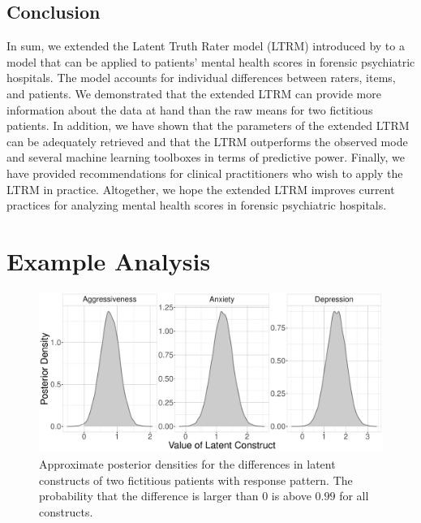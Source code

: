 \documentclass[a4paper,usenames,dvipsnames]{article}
\begin{document}
\subsection*{Conclusion}
In sum, we extended the Latent Truth Rater model (LTRM) introduced by  to a model that can be applied to patients' mental health scores in forensic psychiatric hospitals. The model accounts for individual differences between raters, items, and patients. We demonstrated that the extended LTRM can provide more information about the data at hand than the raw means for two fictitious patients. In addition, we have shown that the parameters of the extended LTRM can be adequately retrieved and that the LTRM outperforms the observed mode and several machine learning toolboxes in terms of predictive power. Finally, we have provided recommendations for clinical practitioners who wish to apply the LTRM in practice. Altogether, we hope the extended LTRM improves current practices for analyzing mental health scores in forensic psychiatric hospitals. 





\newpage
\appendix
{}

\section{Example Analysis}

\begin{figure}[!ht]
	\includegraphics[width=\textwidth]{figures/twoPatientsDiffDensity.pdf}
	\caption{Approximate posterior densities for the differences in latent constructs of two fictitious patients with response pattern. The probability that the difference is larger than 0 is above $0.99$ for all constructs.}
	\label{fig:ExamplePosteriorDiff}
\end{figure}
\end{document}
